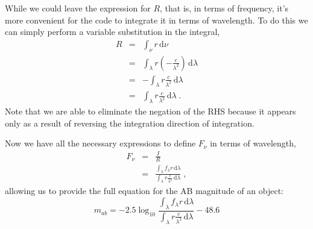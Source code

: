 \documentclass[12pt]{scrartcl}
\newcommand{\dx}[1]{\ensuremath{\,\mathrm{d}#1}}
\begin{document}
While we could leave the expression for $R$, that is, in terms of
frequency, it's more convenient for the code to integrate it in
terms of wavelength. To do this we can simply perform a variable
substitution in the integral,
\begin{eqnarray*}
R & = & \int_\nu r \dx{\nu} \\
& = & \int_\lambda r \left(-\frac{c}{\lambda^2}\right) \dx{\lambda} \\
& = & -\int_\lambda r \frac{c}{\lambda^2} \dx{\lambda} \\
& = & \int_\lambda r \frac{c}{\lambda^2} \dx{\lambda} \; .
\end{eqnarray*}
Note that we are able to eliminate the negation of the RHS because
it appears only as a result of reversing the integration direction
of integration.

Now we have all the necessary expressions to define $F_\nu$ in terms
of wavelength,
\begin{eqnarray*}
F_\nu & = & \frac{I}{R} \\
& = & \frac{{\displaystyle \int_\lambda f_\lambda r \dx{\lambda}}}{{\displaystyle \int_\lambda r \frac{c}{\lambda^2} \dx{\lambda}}} \; ,
\end{eqnarray*}
allowing us to provide the full equation for the AB magnitude of an
object:
\[ m_{ab} = -2.5\log_{10} \frac{{\displaystyle \int_\lambda f_\lambda r \dx{\lambda}}}{{\displaystyle \int_\lambda r \frac{c}{\lambda^2} \dx{\lambda}}} - 48.6 \]
\end{document}
